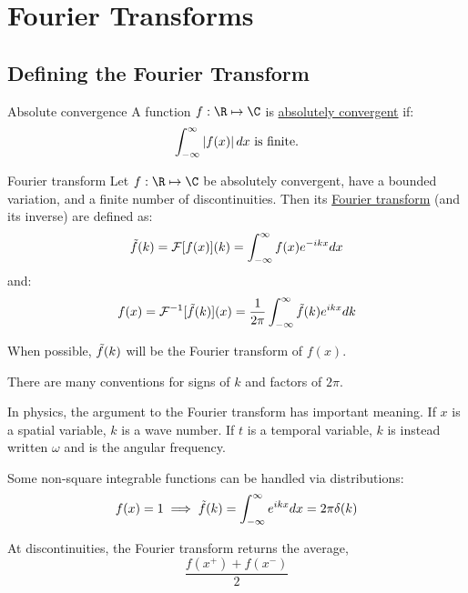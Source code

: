 \documentclass[../Main.tex]{subfiles}
\begin{document}
\section{Fourier Transforms}
\subsection{Defining the Fourier Transform}
\begin{definition}{Absolute convergence}
    A function $f : \R\mapsto\C$ is \underline{absolutely convergent} if:
    \begin{equation*}
        \int_{-\infty}^{\infty} \left|f(x)\right| dx \text{ is finite.}
    \end{equation*}
\end{definition}
\begin{definition}{Fourier transform}
    Let $f : \R \mapsto \C$ be absolutely convergent, have a bounded variation, and a finite number of discontinuities. Then its \underline{Fourier transform} (and its inverse) are defined as:
    \begin{equation*}
        \tilde{f}(k) = \mathcal{F}[f(x)](k) = \int_{-\infty}^{\infty} f(x) e^{-ikx} dx
    \end{equation*}
    and:
    \begin{equation*}
        f(x) = \mathcal{F}^{-1}[\tilde{f}(k)](x) = \frac{1}{2\pi} \int_{-\infty}^{\infty} \tilde{f}(k)e^{ikx} dk 
    \end{equation*}
\end{definition}
\begin{remarks}
    \item When possible, $\tilde{f}(k)$ will be the Fourier transform of $f(x)$.
    \item There are many conventions for signs of $k$ and factors of $2\pi$.
    \item In physics, the argument to the Fourier transform has important meaning. If $x$ is a spatial variable, $k$ is a wave number. If $t$ is a temporal variable, $k$ is instead written $\omega$ and is the angular frequency.
    \item Some non-square integrable functions can be handled via distributions:
        \begin{equation*}
            f(x) = 1 \implies \tilde{f}(k) = \int_{-\infty}^{\infty} e^{ikx} dx = 2\pi \delta(k)
        \end{equation*}
    \item At discontinuities, the Fourier transform returns the average,
        \begin{equation*}
            \frac{f(x^+) + f(x^-)}{2}
        \end{equation*}
\end{remarks}
\end{document}
